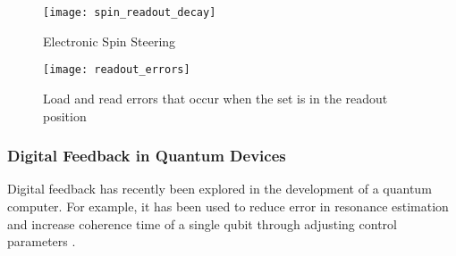 \begin{figure}[htbp!]
	\centering
	\texttt{[image: spin\_readout\_decay]}
	\caption{Electronic Spin Steering}
	\label{fig::electronic_spin_steering}
\end{figure}

\begin{figure}[htbp!]
	\centering
	\texttt{[image: readout\_errors]}
	\caption{Load and read errors that occur when the \gls{set} is in the readout position}
	\label{fig::errors}
\end{figure}

\subsubsection{Digital Feedback in Quantum Devices}

Digital feedback has recently been explored in the development of a quantum computer. For example, it has been used to reduce error in resonance estimation \cite{bonato2015optimized} and increase coherence time of a single qubit through adjusting control parameters \cite{shulman2014suppressing}.
